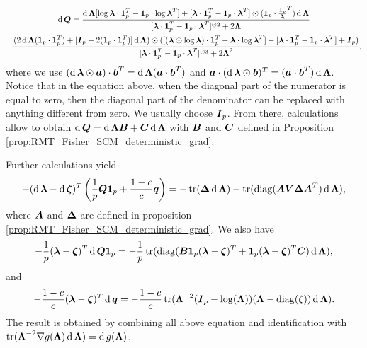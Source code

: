 \begin{multline*}
    \diff\MAT{Q} =
    \frac{
        \diff\eigsMat[\log\VEC{\lambda}\cdot\onevec^T - \onevec\cdot\log\VEC{\lambda}^T] + [\VEC{\lambda}\cdot\onevec^T-\onevec\cdot\VEC{\lambda}^T]\odot(\onevec\cdot\frac{\onevec}{\VEC{\lambda}}^T)\diff\eigsMat
    }
    {
        [\VEC{\lambda}\cdot\onevec^T-\onevec\cdot\VEC{\lambda}^T]^{\odot 2} + 2\eigsMat
    }
    \\
    -\frac{
        (2\diff\eigsMat(\onevec\cdot\onevec^T) + [\eye - 2(\onevec\cdot\onevec^T)]\diff\eigsMat)
        \odot
        ([(\VEC{\lambda}\odot\log\VEC{\lambda})\cdot\onevec^T - \VEC{\lambda}\cdot\log\VEC{\lambda}^T] - [\VEC{\lambda}\cdot\onevec^T - \onevec\cdot\VEC{\lambda}^T] + \eye)
    }
    {
        [\VEC{\lambda}\cdot\onevec^T-\onevec\cdot\VEC{\lambda}^T]^{\odot 3} + 2\eigsMat^2
    },
\end{multline*}
where we use $(\diff\VEC{\lambda}\odot\VEC{a})\cdot\VEC{b}^T=\diff\eigsMat(\VEC{a}\cdot\VEC{b}^T)$ and $\VEC{a}\cdot(\diff\VEC{\lambda}\odot\VEC{b})^T=(\VEC{a}\cdot\VEC{b}^T)\diff\eigsMat$.
Notice that in the equation above, when the diagonal part of the numerator is equal to zero, then the diagonal part of the denominator can be replaced with anything different from zero.
We usually choose $\eye$.
From there, calculations allow to obtain $\diff\MAT{Q}=\diff\eigsMat\MAT{B}+\MAT{C}\diff\eigsMat$ with $\MAT{B}$ and $\MAT{C}$ defined in Proposition \ref{prop:RMT_Fisher_SCM_deterministic_grad}.

Further calculations yield
\begin{equation*}
    - (\diff \VEC{\lambda}-\diff \VEC{\zeta})^T\left( \frac{1}{p} \MAT{Q}\onevec +\frac{1-c}{c} \VEC{q} \right) = -\tr(\MAT{\Delta}\diff\eigsMat) - \tr(\diag(\MAT{A}\MAT{V}\MAT{\Delta}\MAT{A}^T)\diff\eigsMat),
\end{equation*}
where $\MAT{A}$ and $\MAT{\Delta}$ are defined in proposition \ref{prop:RMT_Fisher_SCM_deterministic_grad}.
We also have
$$
    - \frac{1}{p}(\VEC{\lambda}-\VEC{\zeta})^T\diff\MAT{Q}\onevec
    = -\frac1p\tr(\diag(\MAT{B}\onevec(\VEC{\lambda}-\VEC{\zeta})^T + \onevec(\VEC{\lambda}-\VEC{\zeta})^T\MAT{C})\diff\eigsMat),
$$
and
$$
    -\frac{1-c}{c}(\VEC{\lambda}-\VEC{\zeta})^T\diff\VEC{q}
    = -\frac{1-c}{c}\tr(\eigsMat^{-2}(\eye-\log(\eigsMat))(\eigsMat-\diag(\zeta))\diff\eigsMat).
$$
The result is obtained by combining all above equation and identification with $\tr(\eigsMat^{-2}\grad g(\eigsMat)\diff\eigsMat) = \diff g(\MAT{\Lambda})$.

